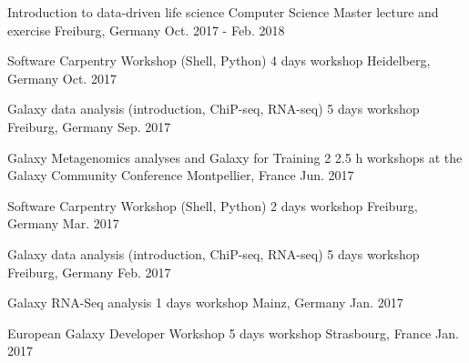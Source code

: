
\begin{cvhonors}

  \cvhonor
    {Introduction to data-driven life science} %
    {Computer Science Master lecture and exercise} %
    {Freiburg, Germany} %
    {Oct. 2017 - Feb. 2018} %

\cvhonor
    {Software Carpentry Workshop (Shell, Python)} %
    {4 days workshop} %
    {Heidelberg, Germany} %
    {Oct. 2017} %

\cvhonor
    {Galaxy data analysis (introduction, ChiP-seq, RNA-seq)} %
    {5 days workshop} %
    {Freiburg, Germany} %
    {Sep. 2017} %

\cvhonor
    {Galaxy Metagenomics analyses and Galaxy for Training} %
    {2 2.5 h workshops at the Galaxy Community Conference} %
    {Montpellier, France} %
    {Jun. 2017} %

\cvhonor
    {Software Carpentry Workshop (Shell, Python)} %
    {2 days workshop} %
    {Freiburg, Germany} %
    {Mar. 2017} %

  \cvhonor
    {Galaxy data analysis (introduction, ChiP-seq, RNA-seq)} %
    {5 days workshop} %
    {Freiburg, Germany} %
    {Feb. 2017} %

  \cvhonor
    {Galaxy RNA-Seq analysis} %
    {1 days workshop} %
    {Mainz, Germany} %
    {Jan. 2017} %

  \cvhonor
    {European Galaxy Developer Workshop} %
    {5 days workshop} %
    {Strasbourg, France} %
    {Jan. 2017} %

\end{cvhonors}

